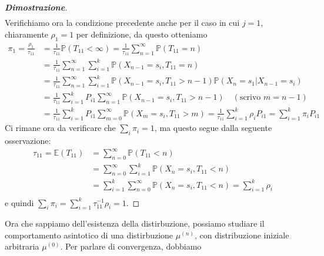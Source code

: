 \documentclass{article}
\theoremstyle{definition}
\theoremstyle{definition}
\theoremstyle{remark}
\begin{document}
\begin{proof}[\textbf{Dimostrazione}]
\begin{align*}
    \end{align*}
    Verifichiamo ora la condizione precedente anche per il caso in cui $j=1$, chiaramente $\rho_1 = 1$ per definizione, da questo otteniamo
    \begin{align*}
        \pi_1 = \frac{\rho_1}{\tau_{11}} & = \frac{1}{\tau_{11}} \mathbb{P}(T_{11}<\infty) = \frac{1}{\tau_{11}} \sum_{n = 1}^{\infty}\mathbb{P}(T_{11} = n)                                                                   \\
                                         & =\frac{1}{\tau_{11}} \sum_{n= 1}^{\infty}\sum_{i = 1}^{k}\mathbb{P}(X_{n-1} = s_i,T_{11} = n)                                                                                       \\
                                         & =\frac{1}{\tau_{11}} \sum_{n= 1}^{\infty}\sum_{i = 1}^{k}\mathbb{P}(X_{n-1} = s_i,T_{11} > n-1)\mathbb{P}(X_n=s_1|X_{n-1}= s_i)                                                     \\
                                         & =\frac{1}{\tau_{11}}  \sum_{i = 1}^{k}P_{i1}\sum_{n= 1}^{\infty}\mathbb{P}(X_{n-1} = s_i,T_{11} > n-1) \quad (\text{scrivo }m = n-1)                                                \\
                                         & = \frac{1}{\tau_{11}} \sum_{i = 1}^{k}P_{i1}\sum_{m= 0}^{\infty}\mathbb{P}(X_{m} = s_i,T_{11} > m) =\frac{1}{\tau_{11}}  \sum_{i = 1}^k \rho_i P_{i1} = \sum_{i = 1}^k \pi_i P_{i1}
    \end{align*}
    Ci rimane ora da verificare che $\sum_{i}\pi_i = 1$, ma questo segue dalla seguente osservazione:
    \begin{align*}
        \tau_{11} = \mathbb{E}(T_{11}) & = \sum_{n=0}^{\infty} \mathbb{P}(T_{11}<n)                                            \\
                                       & =\sum_{n=0}^{\infty}\sum_{i=1}^k \mathbb{P}(X_{n} = s_i,T_{11}<n)                     \\
                                       & = \sum_{i=1}^k\sum_{n=0}^{\infty}\mathbb{P}(X_{n} = s_i,T_{11}<n)=\sum_{i=1}^k \rho_i \\
    \end{align*}
    e quindi $\sum_i \pi_i = \sum_{i=1}^k\tau_{11}^{-1} \rho_i = 1$.
\end{proof}
Ora che sappiamo dell'esistenza della distirbuzione, possiamo studiare il comportamento asintotico di una distirbuzione $\mu^{(n)}$, con distribuzione iniziale arbitraria $\mu^{(0)}$. Per parlare di convergenza, dobbiamo
\end{document}

